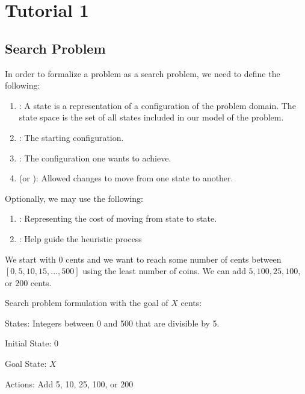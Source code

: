 \setlength{\parindent}{0em}

\section*{Tutorial 1}

\subsection*{Search Problem}

In order to formalize a problem as a search problem, we need to define the following:

\begin{enumerate}
    \item {}: A state is a representation of a configuration of the problem domain. The state space is the set of all states included in our model of the problem.
    \item {}: The starting configuration.
    \item {}: The configuration one wants to achieve. 
    \item {} (or ): Allowed changes to move from one state to another.
\end{enumerate}

Optionally, we may use the following:
\begin{enumerate}
    \item {}: Representing the cost of moving from state to state.
    \item {}: Help guide the heuristic process
\end{enumerate}

\begin{example}
    We start with $0$ cents and we want to reach some number of cents between $[0, 5, 10, 15, ..., 500]$ using the least number of coins. We can add $5, 100, 25, 100$, or $200$ cents.

    Search problem formulation with the goal of $X$ cents:
    \begin{listu}
        \item States: Integers between 0 and 500 that are divisible by 5.
        \item Initial State: 0
        \item Goal State: $X$
        \item Actions: Add 5, 10, 25, 100, or 200
    \end{listu}
\end{example}

